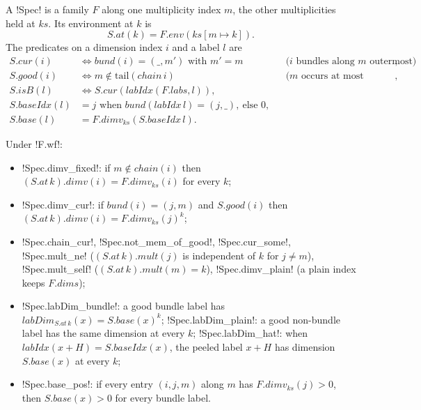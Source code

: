 {\begin{definition}[Spec]\label{def:boxes-spec}
A \lbx!Spec! is a family $F$ along one multiplicity index $m$, the other multiplicities held at $\mathit{ks}$. Its environment at $k$ is
\[
S.\mathit{at}(k)=F.\mathit{env}(\mathit{ks}[m\mapsto k]).
\]
The predicates on a dimension index $i$ and a label $l$ are
\begin{align*}
S.\mathit{cur}(i)&\iff \mathit{bund}(i)=(\_,m') \text{ with } m'=m &&\text{($i$ bundles along $m$ outermost)},\\
S.\mathit{good}(i)&\iff m\notin\mathrm{tail}(\mathit{chain}\,i) &&\text{($m$ occurs at most outermost)},\\
S.\mathit{isB}(l)&\iff S.\mathit{cur}(\mathit{labIdx}(F.\mathit{labs},l)),\\
S.\mathit{baseIdx}(l)&=j \text{ when } \mathit{bund}(\mathit{labIdx}\,l)=(j,\_),\ \text{else } 0,\\
S.\mathit{base}(l)&=F.\mathit{dimv}_{\mathit{ks}}(S.\mathit{baseIdx}\,l).
\end{align*}
\end{definition}

Under \lbx!F.wf!:
\begin{itemize}
\item \lbx!Spec.dimv_fixed!: if $m\notin\mathit{chain}(i)$ then $(S.\mathit{at}\,k).\mathit{dimv}(i)=F.\mathit{dimv}_{\mathit{ks}}(i)$ for every $k$;
\item \lbx!Spec.dimv_cur!: if $\mathit{bund}(i)=(j,m)$ and $S.\mathit{good}(i)$ then $(S.\mathit{at}\,k).\mathit{dimv}(i)=F.\mathit{dimv}_{\mathit{ks}}(j)^k$;
\item \lbx!Spec.chain_cur!, \lbx!Spec.not_mem_of_good!, \lbx!Spec.cur_some!, \lbx!Spec.mult_ne! ($(S.\mathit{at}\,k).\mathit{mult}(j)$ is independent of $k$ for $j\ne m$), \lbx!Spec.mult_self! ($(S.\mathit{at}\,k).\mathit{mult}(m)=k$), \lbx!Spec.dimv_plain! (a plain index keeps $F.\mathit{dims}$);
\item \lbx!Spec.labDim_bundle!: a good bundle label has $\mathit{labDim}_{S.\mathit{at}\,k}(x)=S.\mathit{base}(x)^k$; \lbx!Spec.labDim_plain!: a good non-bundle label has the same dimension at every $k$; \lbx!Spec.labDim_hat!: when $\mathit{labIdx}(x+H)=S.\mathit{baseIdx}(x)$, the peeled label $x+H$ has dimension $S.\mathit{base}(x)$ at every $k$;
\item \lbx!Spec.base_pos!: if every entry $(i,j,m)$ along $m$ has $F.\mathit{dimv}_{\mathit{ks}}(j)>0$, then $S.\mathit{base}(x)>0$ for every bundle label.
\end{itemize}

}
